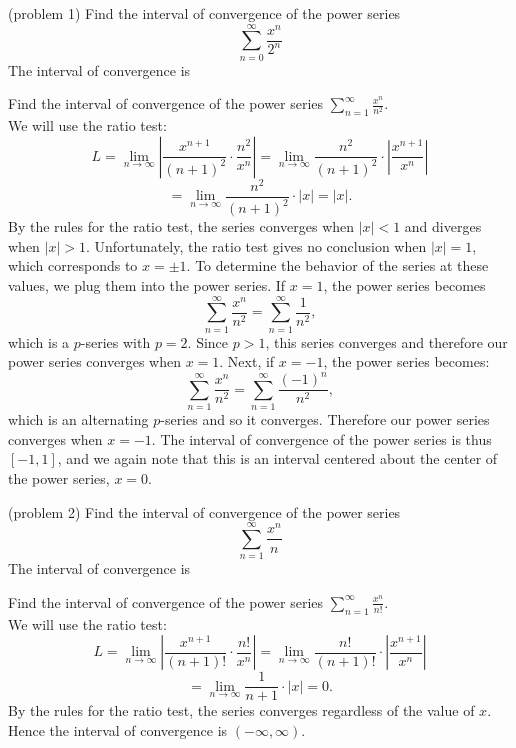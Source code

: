 \documentclass[handout]{ximera}
\begin{document}
\begin{problem}(problem 1)
Find the interval of convergence of the power series
\[
\sum_{n=0}^\infty \frac{x^n}{2^n}
\]
The interval of convergence is
\begin{multipleChoice}
\choice{$(-\infty, \infty)$}
\end{multipleChoice}
\end{problem}


\begin{example}[example 2]
Find the interval of convergence of the power series $\displaystyle{\sum_{n=1}^\infty \frac{x^n}{n^2}}$.\\
We will use the ratio test:
\[
L = \lim_{n \to \infty} \left|\frac{x^{n+1}}{(n+1)^2} \cdot \frac{n^2}{x^n} \right| = \lim_{n \to \infty} \frac{n^2}{(n+1)^2}\cdot \left|  \frac{x^{n+1}}{x^n} \right| 
\]
\[
= \lim_{n \to \infty} \frac{n^2}{(n+1)^2}\cdot \left|  x \right| = |x|.
\]
By the rules for the ratio test, the series converges when $|x| < 1$ and diverges when $|x| > 1$.
Unfortunately, the ratio test gives no conclusion when $|x| = 1$, which corresponds to $x = \pm 1$.
To determine the behavior of the series at these values, we plug them into the power series.
If $x = 1$, the power series becomes
\[
\sum_{n=1}^\infty \frac{x^n}{n^2} = \sum_{n=1}^\infty \frac{1}{n^2},
\]
which is a $p$-series with $p = 2$. Since $p >1$, this series converges and therefore our power series converges when $x = 1$.
Next, if $x = -1$, the power series becomes:
\[
\sum_{n=1}^\infty \frac{x^n}{n^2} = \sum_{n=1}^\infty \frac{(-1)^n}{n^2},
\]
which is an alternating $p$-series and so it converges. Therefore our power series converges when $x = -1$.
The interval of convergence of the power series is thus $[-1, 1]$, and we again note that this is an interval centered about the 
center of the power series, $x = 0$.
\end{example}


\begin{problem}(problem 2)
Find the interval of convergence of the power series
\[
\sum_{n=1}^\infty \frac{x^n}{n}
\]
The interval of convergence is
\begin{multipleChoice}
\choice[correct]{$[-1, 1)$}
\choice{$(-1, 1]$}
\choice{$[-1, 1]$}
\end{multipleChoice}
\end{problem}


\begin{example}[example 3]
Find the interval of convergence of the power series $\displaystyle{\sum_{n=1}^\infty \frac{x^n}{n!}}$.\\
We will use the ratio test:
\[
L = \lim_{n \to \infty} \left|\frac{x^{n+1}}{(n+1)!} \cdot \frac{n!}{x^n} \right| = \lim_{n \to \infty} \frac{n!}{(n+1)!}\cdot \left|  \frac{x^{n+1}}{x^n} \right| 
\]
\[
= \lim_{n \to \infty} \frac{1}{n+1}\cdot |x| = 0.
\]
By the rules for the ratio test, the series converges regardless of the value of $x$.
Hence the interval of convergence is $(-\infty, \infty)$.
\end{example}
\end{document}
